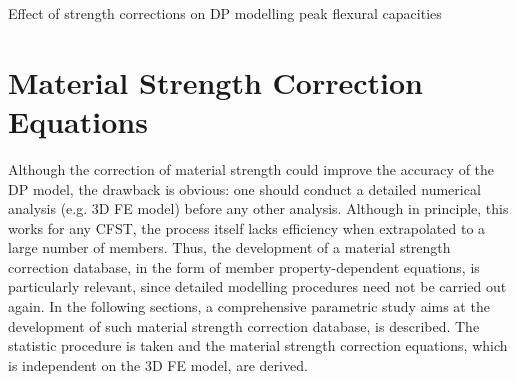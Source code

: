 \documentclass[12pt,a4]{article}
\begin{document}
	\par
	\begin{table}
		\caption{Effect of strength corrections on DP modelling peak flexural capacities}
		\label{tb-3}
	\end{table}
	\par
	\section{Material Strength Correction Equations}
	Although the correction of material strength could improve the accuracy of the DP model, the drawback is obvious: one should conduct a detailed numerical analysis (e.g. 3D FE model) before any other analysis. Although in principle, this works for any CFST, the process itself lacks efficiency when extrapolated to a large number of members. Thus, the development of a material strength correction database, in the form of member property-dependent equations, is particularly relevant, since detailed modelling procedures need not be carried out again. In the following sections, a comprehensive parametric study aims at the development of such material strength correction database, is described. The statistic procedure is taken and the material strength correction equations, which is independent on the 3D FE model, are derived.
	\par
\end{document}
